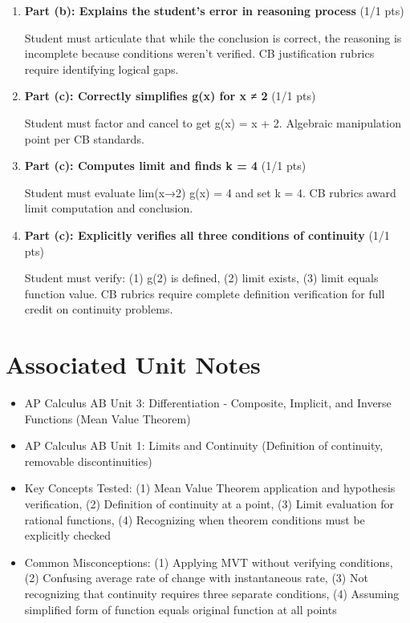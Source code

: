 \documentclass[11pt,letterpaper]{article}
\begin{document}
\begin{tcolorbox}[colback=green!5!white, colframe=green!70, title=\textbf{Total Score: 9 / 9 points}, arc=2mm]
\begin{enumerate}[leftmargin=*]
    \item \textbf{Part (b): Explains the student's error in reasoning process} (1/1 pts)

    Student must articulate that while the conclusion is correct, the reasoning is incomplete because conditions weren't verified. CB justification rubrics require identifying logical gaps.
    

    \item \textbf{Part (c): Correctly simplifies g(x) for x ≠ 2} (1/1 pts)

    Student must factor and cancel to get g(x) = x + 2. Algebraic manipulation point per CB standards.
    

    \item \textbf{Part (c): Computes limit and finds k = 4} (1/1 pts)

    Student must evaluate lim(x→2) g(x) = 4 and set k = 4. CB rubrics award limit computation and conclusion.
    

    \item \textbf{Part (c): Explicitly verifies all three conditions of continuity} (1/1 pts)

    Student must verify: (1) g(2) is defined, (2) limit exists, (3) limit equals function value. CB rubrics require complete definition verification for full credit on continuity problems.
    
  \end{enumerate}
\end{tcolorbox}

\vspace{0.5cm}


\section*{\textcolor{alphablue}{Associated Unit Notes}}

\begin{itemize}[leftmargin=*]
  \item AP Calculus AB Unit 3: Differentiation - Composite, Implicit, and Inverse Functions (Mean Value Theorem)
  \item AP Calculus AB Unit 1: Limits and Continuity (Definition of continuity, removable discontinuities)
  \item Key Concepts Tested: (1) Mean Value Theorem application and hypothesis verification, (2) Definition of continuity at a point, (3) Limit evaluation for rational functions, (4) Recognizing when theorem conditions must be explicitly checked
  \item Common Misconceptions: (1) Applying MVT without verifying conditions, (2) Confusing average rate of change with instantaneous rate, (3) Not recognizing that continuity requires three separate conditions, (4) Assuming simplified form of function equals original function at all points
\end{itemize}
\end{document}
